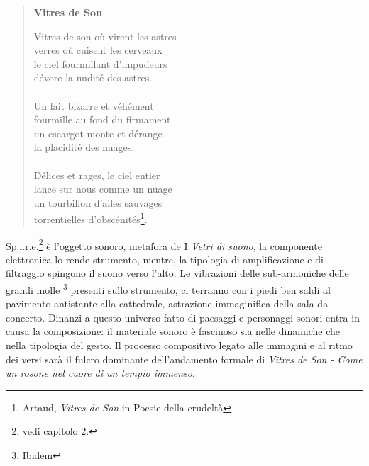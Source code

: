 \begin{quotation}
{\sf \textbf{Vitres de Son}

Vitres de son où virent les astres \\
verres où cuisent les cerveaux \\
le ciel fourmillant d'impudeurs \\
dévore la nudité des astres. \\ \\
Un lait bizarre et véhément \\
fourmille au fond du firmament \\
un escargot monte et dérange \\
la placidité des nuages. \\ \\
Délices et rages, le ciel entier \\
lance sur nous comme un nuage \\
un tourbillon d'ailes sauvages \\
torrentielles d'obscénités\footnote{Artaud, \textit{Vitres de Son} in Poesie della crudeltà}.}
\end{quotation}

Sp.i.r.e.\footnote{vedi capitolo 2.} è l'oggetto sonoro, metafora de I \textit{Vetri di suono}, la componente elettronica lo rende strumento, mentre, la tipologia di amplificazione e di filtraggio spingono il suono verso l'alto. Le vibrazioni delle sub-armoniche delle grandi molle \footnote{Ibidem} presenti sullo strumento, ci terranno con i piedi ben saldi al pavimento antistante alla cattedrale, astrazione immaginifica della sala da concerto. Dinanzi a questo universo fatto di paesaggi e personaggi sonori entra in causa la composizione: il materiale sonoro è fascinoso sia nelle dinamiche che nella tipologia del gesto. Il processo compositivo legato alle immagini e al ritmo dei versi sarà il fulcro dominante dell'andamento formale di \textit{Vitres de Son - Come un rosone nel cuore di un tempio immenso}.
